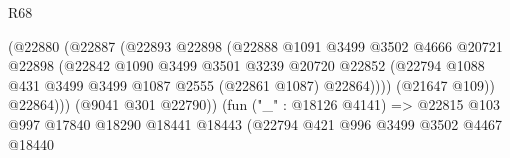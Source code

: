 \begin{lexlean}{R68}
\begin{coremodule}
                                              (@22880
                                                (@22887
                                                  (@22893
                                                    @22898
                                                    (@22888
                                                      @1091
                                                      @3499
                                                      @3502
                                                      @4666
                                                      @20721
                                                      @22898
                                                      (@22842
                                                        @1090
                                                        @3499
                                                        @3501
                                                        @3239
                                                        @20720
                                                        @22852
                                                        (@22794
                                                          @1088
                                                          @431
                                                          @3499
                                                          @3499
                                                          @1087
                                                          @2555
                                                          (@22861 @1087)
                                                          @22864))))
                                                  (@21647 @109))
                                                @22864)))
                                          (@9041 @301 @22790))
                                        (fun ("_" : @18126 @4141) =>
                                        @22815
                                          @103
                                          @997
                                          @17840
                                          @18290
                                          @18441
                                          @18443
                                          (@22794
                                            @421
                                            @996
                                            @3499
                                            @3502
                                            @4467
                                            @18440

\end{coremodule}
\end{lexlean}
